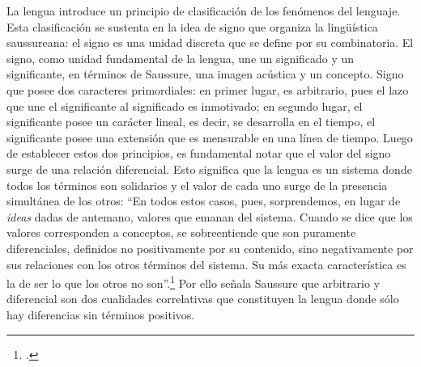 La lengua introduce un principio de clasificación de los fenómenos del lenguaje. Esta clasificación se sustenta en la idea de signo que organiza la lingüística saussureana: el signo es una unidad discreta que se define por su combinatoria. El signo, como unidad fundamental de la lengua, une un significado y un significante, en términos de Saussure, una imagen acústica y un concepto. Signo que posee dos caracteres primordiales: en primer lugar, es arbitrario, pues el lazo que une el significante al significado es inmotivado; en segundo lugar, el significante posee un carácter lineal, es decir, se desarrolla en el tiempo, el significante posee una extensión que es mensurable en una línea de tiempo. Luego de establecer estos dos principios, es fundamental notar que el valor del signo surge de una relación diferencial. Esto significa que la lengua es un sistema donde todos los términos son solidarios y el valor de cada uno surge de la presencia simultánea de los otros: \enquote{En todos estos casos, pues, sorprendemos, en lugar de \emph{ideas} dadas de antemano, valores que emanan del sistema. Cuando se dice que los valores corresponden a conceptos, se sobreentiende que son puramente diferenciales, definidos no positivamente por su contenido, sino negativamente por sus relaciones con los otros términos del sistema. Su más exacta característica es la de ser lo que los otros no son}.\footcite[141]{@6968-SAUSSURE1945} Por ello señala Saussure que arbitrario y diferencial son dos cualidades correlativas que constituyen la lengua donde sólo hay diferencias sin términos positivos.

